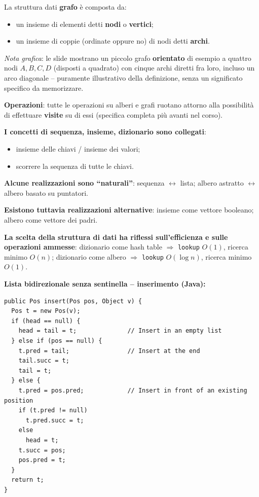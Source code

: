 \documentclass[12pt, a4paper]{article}
\begin{document}
\begin{tcolorbox}[colback=lightergray!10, colframe=tocsec, title=\textbf{Definizione: Grafo}]
\label{def:grafo}
La struttura dati \textbf{grafo} è composta da:
\begin{itemize}
    \item un insieme di elementi detti \textbf{nodi} o \textbf{vertici};
    \item un insieme di coppie (ordinate oppure no) di nodi detti \textbf{archi}.
\end{itemize}
\end{tcolorbox}

\textit{Nota grafica}: le slide mostrano un piccolo grafo \textbf{orientato} di esempio a quattro nodi $A,B,C,D$ (disposti a quadrato) con cinque archi diretti fra loro, incluso un arco diagonale -- puramente illustrativo della definizione, senza un significato specifico da memorizzare.

\textbf{Operazioni}: tutte le operazioni su alberi e grafi ruotano attorno alla possibilità di effettuare \textbf{visite} su di essi (specifica completa più avanti nel corso).

\begin{tcolorbox}[colback=lightergray!5, colframe=tocsubsec, title=\textbf{Commenti Conclusivi}]
\textbf{I concetti di sequenza, insieme, dizionario sono collegati}:
\begin{itemize}
    \item insieme delle chiavi / insieme dei valori;
    \item scorrere la sequenza di tutte le chiavi.
\end{itemize}
\textbf{Alcune realizzazioni sono ``naturali''}: sequenza $\leftrightarrow$ lista; albero astratto $\leftrightarrow$ albero basato su puntatori.

\textbf{Esistono tuttavia realizzazioni alternative}: insieme come vettore booleano; albero come vettore dei padri.

\textbf{La scelta della struttura di dati ha riflessi sull'efficienza e sulle operazioni ammesse}: dizionario come hash table $\Rightarrow$ \texttt{lookup} $O(1)$, ricerca minimo $O(n)$; dizionario come albero $\Rightarrow$ \texttt{lookup} $O(\log n)$, ricerca minimo $O(1)$.
\end{tcolorbox}


\textbf{Lista bidirezionale senza sentinella -- inserimento (Java):}
\begin{verbatim}
public Pos insert(Pos pos, Object v) {
  Pos t = new Pos(v);
  if (head == null) {
    head = tail = t;              // Insert in an empty list
  } else if (pos == null) {
    t.pred = tail;                // Insert at the end
    tail.succ = t;
    tail = t;
  } else {
    t.pred = pos.pred;            // Insert in front of an existing position
    if (t.pred != null)
      t.pred.succ = t;
    else
      head = t;
    t.succ = pos;
    pos.pred = t;
  }
  return t;
}
\end{verbatim}
\end{document}
